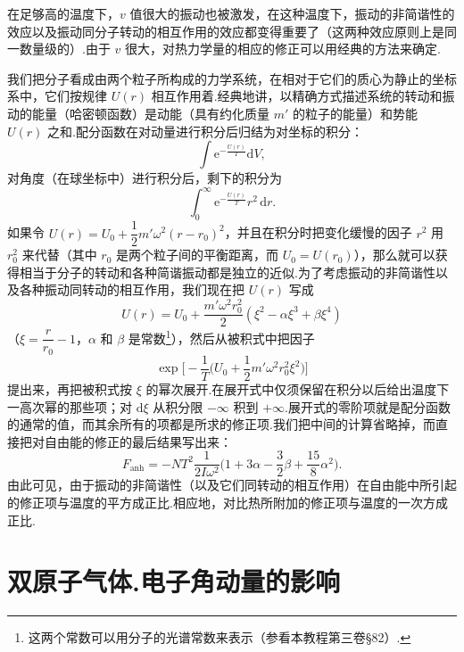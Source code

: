在足够高的温度下，$v$ 值很大的振动也被激发，在这种温度下，振动的非简谐性的效应以及振动同分子转动的相互作用的效应都变得重要了（这两种效应原则上是同一数量级的）.由于 $v$ 很大，对热力学量的相应的修正可以用经典的方法来确定.

我们把分子看成由两个粒子所构成的力学系统，在相对于它们的质心为静止的坐标系中，它们按规律 $U(r)$ 相互作用着.经典地讲，以精确方式描述系统的转动和振动的能量（哈密顿函数）是动能（具有约化质量 $m'$ 的粒子的能量）和势能 $U(r)$ 之和.配分函数在对动量进行积分后归结为对坐标的积分：
\begin{equation*}
  \int\mathrm{e}^{-\frac{U(r)}{T}}\mathrm{d}V,
\end{equation*}
对角度（在球坐标中）进行积分后，剩下的积分为
\begin{equation*}
  \int_0^{\infty}\mathrm{e}^{-\frac{U(r)}{T}}r^2\,\mathrm{d}r.
\end{equation*}
如果令 $U(r)=U_0+\dfrac{1}{2}m'\omega^2(r-r_0)^2$，并且在积分时把变化缓慢的因子 $r^2$ 用 $r_0^2$ 来代替（其中 $r_0$ 是两个粒子间的平衡距离，而 $U_0=U(r_0)$），那么就可以获得相当于分子的转动和各种简谐振动都是独立的近似.为了考虑振动的非简谐性以及各种振动同转动的相互作用，我们现在把 $U(r)$ 写成
\begin{equation}
  U(r)=U_0+\frac{m'\omega^2r_0^2}{2}
  \left(\xi^2-\alpha\xi^3+\beta\xi^4\right)
\end{equation}
（$\xi=\dfrac{r}{r_0}-1$，$\alpha$ 和 $\beta$ 是常数\footnote{这两个常数可以用分子的光谱常数来表示（参看本教程第三卷§82）.}），然后从被积式中把因子
\begin{equation*}
  \exp\Bigg[-\frac{1}{T}\Big(U_0+\frac{1}{2}m'\omega^2r_0^2\xi^2\Big)\Bigg]
\end{equation*}
提出来，再把被积式按 $\xi$ 的幂次展开.在展开式中仅须保留在积分以后给出温度下一高次幂的那些项；对 $\mathrm{d}\xi$ 从积分限 $-\infty$ 积到 $+\infty$.展开式的零阶项就是配分函数的通常的值，而其余所有的项都是所求的修正项.我们把中间的计算省略掉，而直接把对自由能的修正的最后结果写出来：
\begin{equation}
  F_{\mathrm{anh}}=-NT^2\frac{1}{2I\omega^2}
  \Big(1+3\alpha-\frac{3}{2}\beta+\frac{15}{8}\alpha^2\Big).
\end{equation}
由此可见，由于振动的非简谐性（以及它们同转动的相互作用）在自由能中所引起的修正项与温度的平方成正比.相应地，对比热所附加的修正项与温度的一次方成正比.

\section{双原子气体.电子角动量的影响}

